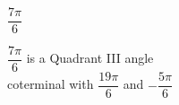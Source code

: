 {$\dfrac{7\pi}{6}$}
{$\dfrac{7\pi}{6}$ is a Quadrant III angle\\
coterminal with $\dfrac{19 \pi}{6}$ and $-\dfrac{5\pi}{6}$

\begin{center}
\end{center}}